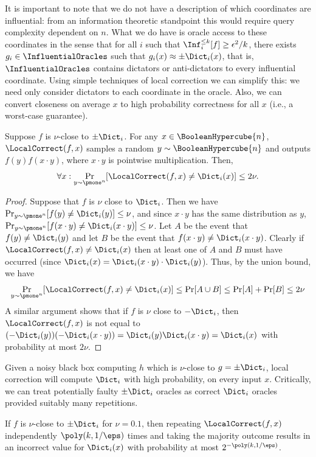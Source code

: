 It is important to note that we do not have a description of which coordinates are influential: from an information theoretic standpoint this would require query complexity dependent on $n$. What we do have is oracle access to these coordinates in the sense that for all $i$ such that $\Inf_i^{\leq k}[f] \geq \epsilon^2/k$, there exists $g_i \in \InfluentialOracles$
such that $g_i(x) \approx \pm \Dict_i(x)$, that is, $\InfluentialOracles$ contains dictators or anti-dictators to every influential coordinate. Using simple techniques of local correction we can simplify this: we need only consider dictators to each coordinate in the oracle. Also, we can convert closeness on average $x$ to high probability correctness for all $x$ (i.e., a worst-case guarantee).\begin{lemma}
\label{lemma:localcorrect}
Suppose $f$ is $\nu$-close to $\pm \Dict_i$. For any $x \in \BooleanHypercube{n}$, $\LocalCorrect(f, x)$ samples a random $y \sim \BooleanHypercube{n}$ and outputs $f(y)f(x\cdot y)$, where $x \cdot y$ is pointwise multiplication. Then,$$\forall{x}: \Pr_{y\sim \pmone^n}[\LocalCorrect(f,x) \neq \Dict_i(x)] \leq 2\nu.$$

\end{lemma}
\begin{proof}
Suppose that $f$ is $\nu$ close to $\Dict_i$. Then we have $\Pr_{y \sim \pmone^n}[f(y) \neq \Dict_i(y)] \leq \nu$, and since $x\cdot y$ has the same distribution as $y$, $\Pr_{y \sim \pmone^n}[f(x\cdot y) \neq \Dict_i(x \cdot y)] \leq \nu$. Let $A$ be the event that $f(y) \neq \Dict_i(y)$ and let $B$ be the event that $f(x\cdot y) \neq \Dict_i(x \cdot y)$. Clearly if $\LocalCorrect(f,x) \neq \Dict_i(x)$ then at least one of $A$ and $B$ must have occurred (since $\Dict_i(x) = \Dict_i(x\cdot y) \cdot \Dict_i(y)$). Thus, by the union bound, we have
$$
\Pr_{y \sim \pmone^n}[\LocalCorrect(f,x) \neq \Dict_i(x)]\leq \Pr[A \cup B] \leq \Pr[A] + \Pr[B] \leq 2\nu
$$
A similar argument shows that if $f$ is $\nu$ close to $-\Dict_i$, then $\LocalCorrect(f,x)$ is not equal to $(-\Dict_i(y))(-\Dict_i(x \cdot y)) = \Dict_i(y)\Dict_i(x \cdot y) = \Dict_i(x)$ with probability at most $2\nu$. 
\end{proof}

Given a noisy black box computing $h$ which is $\nu$-close to $g = \pm \Dict_i$, local correction will compute $\Dict_i$ with high probability, on every input $x$. Critically, we can treat potentially faulty $\pm \Dict_i$ oracles as correct $\Dict_i$ oracles provided suitably many repetitions.
\begin{corollary}
\label{corollary:localcorrect}
If $f$ is $\nu$-close to $\pm \Dict_i$ for $\nu=0.1$, then repeating $\LocalCorrect(f,x)$ independently $\poly(k,1/\eps)$ times and taking the majority outcome results in an incorrect value for $\Dict_i(x)$ with probability at most $2^{-\poly(k,1/\eps)}$.
\end{corollary}

